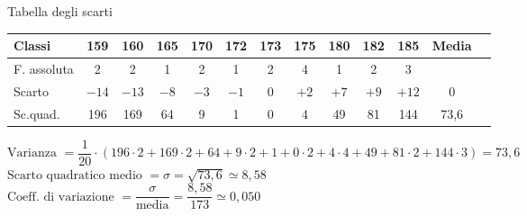 \begin{esempio}
\begin{enumeratea}
Tabella degli scarti
\begin{center}
\begin{tabular}{lcccccccccccr}
\toprule
Classi & 159 & 160 & 165 & 170 & 172 & 173 & 175 & 180 & 182 & 185 & Media\\
\midrule
F. assoluta & 2 & 2 & 1 & 2 & 1 & 2 & 4 & 1 & 2 & 3  & \\
Scarto & \(-14\) & \(-13\) & \(-8\) & \(-3\) & \(-1\) & \(0\) & \(+2\) & 
\(+7\) & \(+9\) & \(+12\) & 0\\
Sc.quad. & 196 & 169 & 64 & 9 & 1 & 0 & 4 & 
49 & 81 & 144 & 73,6\\
\end{tabular}
\end{center}
\end{enumeratea}
\(\text{Varianza } = \dfrac{1}{20} \cdot 
(196 \cdot 2 + 169 \cdot 2 + 64 + 9 \cdot 2 + 1 + 0 \cdot 2 + 
4 \cdot 4 + 49 + 81 \cdot 2 + 144 \cdot 3) = 73,6\)\\
\(\text{Scarto quadratico medio } = \sigma =
  \sqrt{73,6} \simeq 8,58\)\\
\(\text{Coeff. di variazione } = \dfrac{\sigma}{\text{media}} = 
  \dfrac{8,58}{173} \simeq 0,050\)



\end{esempio}
